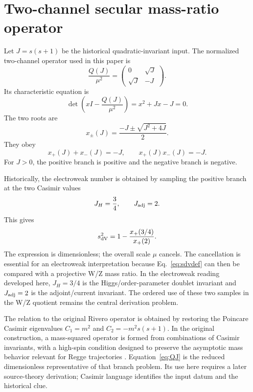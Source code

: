 \section{Two-channel secular mass-ratio operator}
\label{sec:casimir}

Let \(J=s(s+1)\) be the historical quadratic-invariant input.  The normalized two-channel operator used in this paper is
\begin{equation}
  \frac{Q(J)}{\mu^2}=\begin{pmatrix}
  0 & \sqrt{J}\\
  \sqrt{J} & -J
  \end{pmatrix}.
  \label{eq:QJ}
\end{equation}
Its characteristic equation is
\begin{equation}
  \det\left(xI-\frac{Q(J)}{\mu^2}\right)=x^2+Jx-J=0.
  \label{eq:charpoly}
\end{equation}
The two roots are
\begin{equation}
  x_\pm(J)=\frac{-J\pm\sqrt{J^2+4J}}{2}.
  \label{eq:roots}
\end{equation}
They obey
\begin{equation}
  x_+(J)+x_-(J)=-J,
  \qquad
  x_+(J)x_-(J)=-J.
  \label{eq:root-identities}
\end{equation}
For \(J>0\), the positive branch is positive and the negative branch is negative.

Historically, the electroweak number is obtained by sampling the positive branch at the two Casimir values
\begin{equation}
  J_H=\frac34,
  \qquad
  J_{\rm adj}=2.
  \label{eq:historical-J-samples}
\end{equation}
This gives
\begin{equation}
  s^2_{\rm dV} = 1-\frac{x_+(3/4)}{x_+(2)}.
  \label{eq:sdvdef}
\end{equation}
The expression is dimensionless; the overall scale \(\mu\) cancels.  The cancellation is essential for an electroweak interpretation because Eq.~\eqref{eq:sdvdef} can then be compared with a projective W/Z mass ratio.  In the electroweak reading developed here, \(J_H=3/4\) is the Higgs/order-parameter doublet invariant and \(J_{\rm adj}=2\) is the adjoint/current invariant.  The ordered use of these two samples in the W/Z quotient remains the central derivation problem.

The relation to the original Rivero operator is obtained by restoring the Poincare Casimir eigenvalues \(C_1=m^2\) and \(C_2=-m^2s(s+1)\).  In the original construction, a mass-squared operator is formed from combinations of Casimir invariants, with a high-spin condition designed to preserve the asymptotic mass behavior relevant for Regge trajectories \cite{Rivero2006}.  Equation~\eqref{eq:QJ} is the reduced dimensionless representative of that branch problem.  Its use here requires a later source-theory derivation; Casimir language identifies the input datum and the historical clue.


